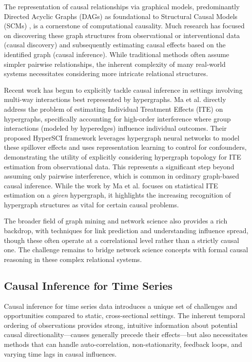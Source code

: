 {{The representation of causal relationships via graphical models, predominantly Directed Acyclic Graphs (DAGs) as foundational to Structural Causal Models (SCMs) \cite{Pearl2009Causality}, is a cornerstone of computational causality. Much research has focused on discovering these graph structures from observational or interventional data (causal discovery) and subsequently estimating causal effects based on the identified graph (causal inference). While traditional methods often assume simpler pairwise relationships, the inherent complexity of many real-world systems necessitates considering more intricate relational structures.

Recent work has begun to explicitly tackle causal inference in settings involving multi-way interactions best represented by hypergraphs. Ma et al. \cite{ma2022learning} directly address the problem of estimating Individual Treatment Effects (ITE) on hypergraphs, specifically accounting for high-order interference where group interactions (modeled by hyperedges) influence individual outcomes. Their proposed HyperSCI framework leverages hypergraph neural networks to model these spillover effects and uses representation learning to control for confounders, demonstrating the utility of explicitly considering hypergraph topology for ITE estimation from observational data. This represents a significant step beyond assuming only pairwise interference, which is common in ordinary graph-based causal inference. While the work by Ma et al. focuses on statistical ITE estimation on a \textit{given} hypergraph, it highlights the increasing recognition of hypergraph structures as vital for certain causal problems.

The broader field of graph mining and network science also provides a rich backdrop, with techniques for link prediction and understanding influence spread, though these often operate at a correlational level rather than a strictly causal one. The challenge remains to bridge network science concepts with formal causal reasoning in these complex relational systems.


\subsection{Causal Inference for Time Series}
\label{subsec:causal_timeseries}

Causal inference for time series data introduces a unique set of challenges and opportunities compared to static, cross-sectional settings. The inherent temporal ordering of observations provides strong, intuitive information about potential causal directionality---causes generally precede their effects---but also necessitates methods that can handle auto-correlation, non-stationarity, feedback loops, and varying time lags in causal influences.

}}
